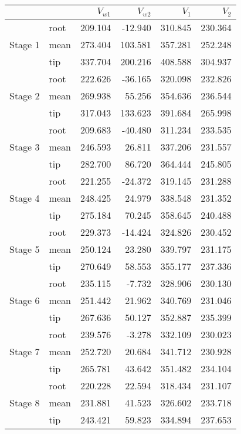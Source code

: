 \begin{center}
\begin{tabular}{llrrrr}
\toprule
 &  & $V_{w1}$ & $V_{w2}$ & $V_{1}$ & $V_{2}$ \\
\midrule
\multirow[t]{3}{*}{Stage 1} & root & 209.104 & -12.940 & 310.845 & 230.364 \\
 & mean & 273.404 & 103.581 & 357.281 & 252.248 \\
 & tip & 337.704 & 200.216 & 408.588 & 304.937 \\
\cline{1-6}
\multirow[t]{3}{*}{Stage 2} & root & 222.626 & -36.165 & 320.098 & 232.826 \\
 & mean & 269.938 & 55.256 & 354.636 & 236.544 \\
 & tip & 317.043 & 133.623 & 391.684 & 265.998 \\
\cline{1-6}
\multirow[t]{3}{*}{Stage 3} & root & 209.683 & -40.480 & 311.234 & 233.535 \\
 & mean & 246.593 & 26.811 & 337.206 & 231.557 \\
 & tip & 282.700 & 86.720 & 364.444 & 245.805 \\
\cline{1-6}
\multirow[t]{3}{*}{Stage 4} & root & 221.255 & -24.372 & 319.145 & 231.288 \\
 & mean & 248.425 & 24.979 & 338.548 & 231.352 \\
 & tip & 275.184 & 70.245 & 358.645 & 240.488 \\
\cline{1-6}
\multirow[t]{3}{*}{Stage 5} & root & 229.373 & -14.424 & 324.826 & 230.452 \\
 & mean & 250.124 & 23.280 & 339.797 & 231.175 \\
 & tip & 270.649 & 58.553 & 355.177 & 237.336 \\
\cline{1-6}
\multirow[t]{3}{*}{Stage 6} & root & 235.115 & -7.732 & 328.906 & 230.130 \\
 & mean & 251.442 & 21.962 & 340.769 & 231.046 \\
 & tip & 267.636 & 50.127 & 352.887 & 235.399 \\
\cline{1-6}
\multirow[t]{3}{*}{Stage 7} & root & 239.576 & -3.278 & 332.109 & 230.023 \\
 & mean & 252.720 & 20.684 & 341.712 & 230.928 \\
 & tip & 265.781 & 43.642 & 351.482 & 234.104 \\
\cline{1-6}
\multirow[t]{3}{*}{Stage 8} & root & 220.228 & 22.594 & 318.434 & 231.107 \\
 & mean & 231.881 & 41.523 & 326.602 & 233.718 \\
 & tip & 243.421 & 59.823 & 334.894 & 237.653 \\
\cline{1-6}
\bottomrule
\end{tabular}
\end{center}

